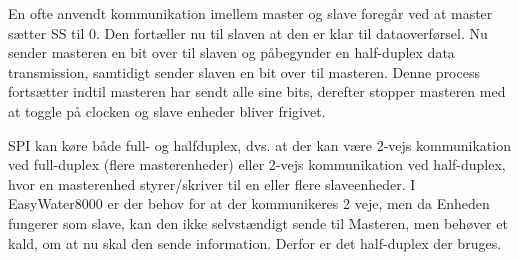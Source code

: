 En ofte anvendt kommunikation imellem master og slave foregår ved at master sætter SS til 0. Den fortæller nu til slaven at den er klar til 
dataoverførsel. Nu sender masteren en bit over til slaven og påbegynder en half-duplex data transmission, samtidigt sender slaven en bit over til masteren. Denne process fortsætter indtil masteren har sendt alle sine bits, derefter stopper masteren med at toggle på clocken og slave enheder bliver frigivet.

SPI kan køre både full- og halfduplex, dvs. at der kan være 2-vejs kommunikation ved full-duplex (flere masterenheder) eller 2-vejs kommunikation ved half-duplex, hvor en masterenhed styrer/skriver til en eller flere slaveenheder. I EasyWater8000 er der behov for at der kommunikeres 2 veje, men da Enheden fungerer som slave, kan den ikke selvstændigt sende til Masteren, men behøver et kald, om at nu skal den sende information. Derfor er det half-duplex der bruges.

